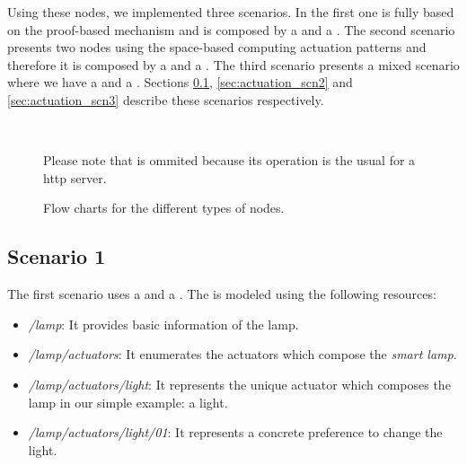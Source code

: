 Using these nodes, we implemented three scenarios.
In the first one is fully based on the proof-based mechanism and is composed by a \prova{} and a \consc{}.
The second scenario presents two nodes using the space-based computing actuation patterns and therefore it is composed by a \provb{} and a \consd{}.
The third scenario presents a mixed scenario where we have a \prova{} and a \consd{}.
Sections \ref{sec:actuation_scn1}, \ref{sec:actuation_scn2} and \ref{sec:actuation_scn3} describe these scenarios respectively.


\begin{figure}
        \centering %
	~ %
        ~ %
        \caption{Flow charts for the different types of nodes.}
        {Please note that \typea{} is ommited because its operation is the usual for a \acs{http} server.} %
        \label{fig:flow_nodes}
\end{figure}


\subsection{Scenario 1}
\label{sec:actuation_scn1}

The first scenario uses a \prova{} and a \consc{}.
The \prova{} is modeled using the following resources:
\begin{itemize}
  \item \emph{/lamp}: It provides basic information of the lamp.
  \item \emph{/lamp/actuators}: It enumerates the actuators which compose the \emph{smart lamp}.
  \item \emph{/lamp/actuators/light}: It represents the unique actuator which composes the lamp in our simple example: a light.
  \item \emph{/lamp/actuators/light/01}: It represents a concrete preference to change the light.
\end{itemize}


